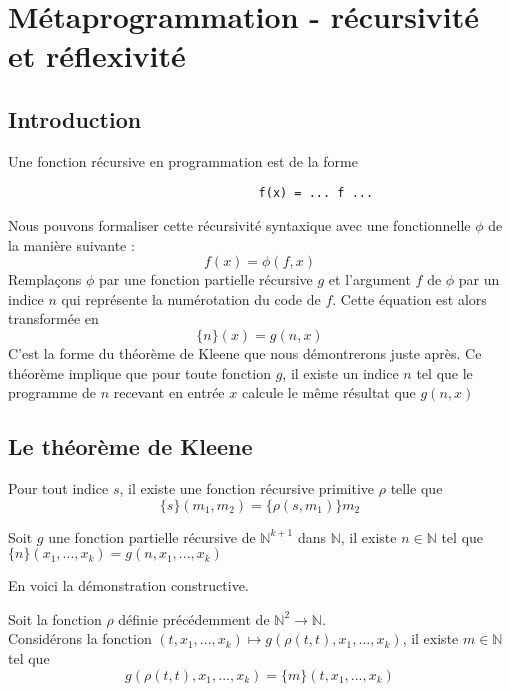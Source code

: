 \section{Métaprogrammation - récursivité et réflexivité}
\subsection{Introduction}
Une fonction récursive en programmation est de la forme
\begin{center}	
\begin{Verbatim}
                                   f(x) = ... f ...
\end{Verbatim}
\end{center}

Nous pouvons formaliser cette récursivité syntaxique avec une fonctionnelle $\phi$ de la manière suivante :
$$
f(x)=\phi(f,x)
$$
Remplaçons $\phi$ par une fonction partielle récursive $g$ et l'argument $f$ de $\phi$ par un indice $n$ qui représente la numérotation 
du code de $f$. Cette équation est alors transformée en 
$$ \{n\}(x)=g(n,x)$$
C'est la forme du théorème de Kleene que nous démontrerons juste après. Ce théorème implique que pour toute fonction $g$,
il existe un indice $n$ tel que  le programme de $n$ recevant en entrée $x$ calcule le même résultat que $g(n,x)$	

\subsection{Le théorème de Kleene}
\begin{theoreme}[S-M-N]
Pour tout indice $s$, il existe une fonction récursive primitive $\rho$ telle que 
$$ \{s\}(m_1,m_2) = \{\rho(s,m_1)\}m_2 $$
\end{theoreme}

\begin{theoreme}[Kleene]
Soit $g$ une fonction partielle récursive de $\mathbb{N}^{k+1}$ dans $\mathbb{N}$, il existe
$n \in \mathbb{N}$ tel que $\{n\}(x_1, ..., x_k) = g (n,x_1, ...,x_k)$
\end{theoreme}

En voici  la démonstration constructive. 

Soit la fonction $\rho$ définie précédemment de $\mathbb{N}^2 \rightarrow \mathbb{N}.$ \\
Considérons la fonction $ (t,x_1,...,x_k) \mapsto g(\rho(t,t), x_1, ..., x_k) $,
il existe  $m \in \mathbb{N}$ tel que $$g(\rho(t,t),x_1, ...,x_k) = \{m\}(t, x_1, ..., x_k)$$ 

